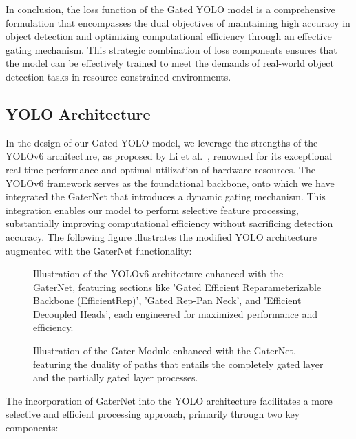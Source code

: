 In conclusion, the loss function of the Gated YOLO model is a comprehensive formulation that encompasses the dual objectives of maintaining high accuracy in object detection and optimizing computational efficiency through an effective gating mechanism. This strategic combination of loss components ensures that the model can be effectively trained to meet the demands of real-world object detection tasks in resource-constrained environments.

\subsection{YOLO Architecture}

In the design of our Gated YOLO model, we leverage the strengths of the YOLOv6 architecture, as proposed by Li et al.~\cite{li2023yolov6,li2022yolov6}, renowned for its exceptional real-time performance and optimal utilization of hardware resources. The YOLOv6 framework serves as the foundational backbone, onto which we have integrated the GaterNet that introduces a dynamic gating mechanism. This integration enables our model to perform selective feature processing, substantially improving computational efficiency without sacrificing detection accuracy. The following figure illustrates the modified YOLO architecture augmented with the GaterNet functionality:

\begin{figure}[ht]
    \centering
    
    \caption{Illustration of the YOLOv6 architecture enhanced with the GaterNet, featuring sections like 'Gated Efficient Reparameterizable Backbone (EfficientRep)', 'Gated Rep-Pan Neck', and 'Efficient Decoupled Heads', each engineered for maximized performance and efficiency.}
    \label{fig:yolo_architecture}
    \end{figure}

\begin{figure}[ht]
    \centering
    
    \caption{Illustration of the Gater Module enhanced with the GaterNet, featuring the duality of paths that entails the completely gated layer and the partially gated layer processes.}
    \label{fig:gating_mechanism}
    \end{figure}

The incorporation of GaterNet into the YOLO architecture facilitates a more selective and efficient processing approach, primarily through two key components:

